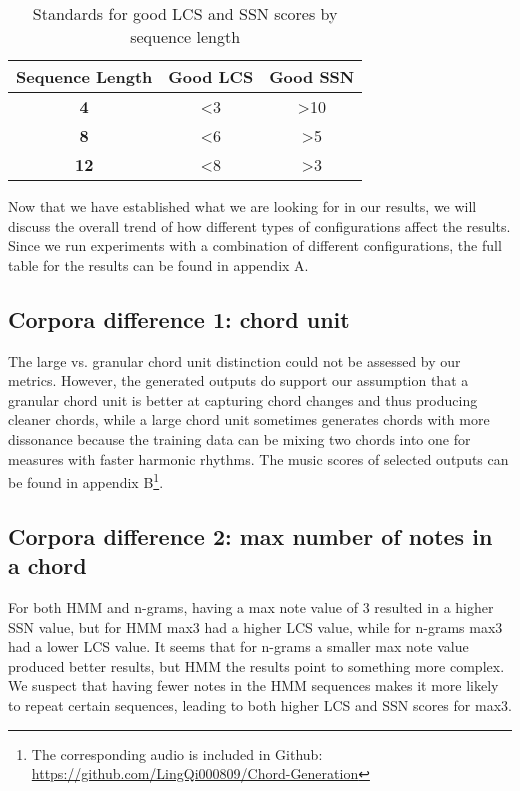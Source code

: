 \documentclass[11pt,a4paper]{article}
\begin{document}
\begin{table}
\centering
\begin{tabular}[b]{|c|c|c|}
\hline \textbf{Sequence Length} & \textbf{Good LCS} & \textbf{Good SSN} \\
\hline 
\textbf{4} & \textless 3 & \textgreater 10 \\
\hline 
\textbf{8} & \textless 6 & \textgreater 5 \\
\hline 
\textbf{12} & \textless 8 & \textgreater 3 \\
\hline 
\end{tabular}
\caption{\label{evaluation standard} Standards for good LCS and SSN scores by sequence length}
\end{table}

Now that we have established what we are looking for in our results, we will discuss the overall trend of how different types of configurations affect the results. Since we run experiments with a combination of different configurations, the full table for the results can be found in appendix A. 

\subsection{Corpora difference 1: chord unit}
The large vs. granular chord unit distinction could not be assessed by our metrics. However, the generated outputs do support our assumption that a granular chord unit is better at capturing chord changes and thus producing cleaner chords, while a large chord unit sometimes generates chords with more dissonance because the training data can be mixing two chords into one for measures with faster harmonic rhythms. The music scores of selected outputs can be found in appendix B\footnote{ The corresponding audio is included in Github: \url{https://github.com/LingQi000809/Chord-Generation}}.

\subsection{Corpora difference 2: max number of notes in a chord}
For both HMM and n-grams, having a max note value of 3 resulted in a higher SSN value, but for HMM max3 had a higher LCS value, while for n-grams max3 had a lower LCS value. It seems that for n-grams a smaller max note value produced better results, but HMM the results point to something more complex. We suspect that having fewer notes in the HMM sequences makes it more likely to repeat certain sequences, leading to both higher LCS and SSN scores for max3.
\end{document}

